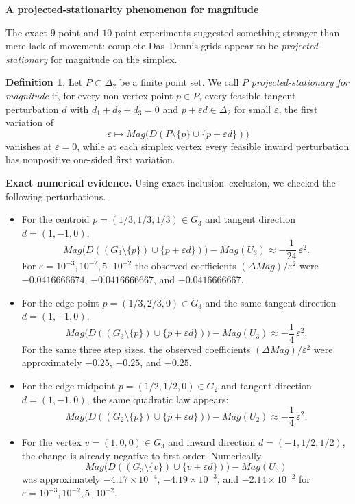 \documentclass{article}
\def\Mag{Mag}%
\theoremstyle{definition}
\newtheorem{definition}[theorem]{Definition}
\newcommand{\Mag}{\operatorname{Mag}}
\newcommand{\1}{\mathbf{1}}
\newcommand{\myparagraph}[1]{\medskip\noindent\textbf{#1}}
\begin{document}
\myparagraph{A projected-stationarity phenomenon for magnitude}

The exact $9$-point and $10$-point experiments suggested something stronger than mere lack of movement: complete Das--Dennis grids appear to be \emph{projected-stationary} for magnitude on the simplex.

\begin{definition}
Let $P\subset\Delta_2$ be a finite point set. We call $P$ \emph{projected-stationary for magnitude} if, for every non-vertex point $p\in P$, every feasible tangent perturbation $d$ with $d_1+d_2+d_3=0$ and $p+\varepsilon d\in\Delta_2$ for small $\varepsilon$, the first variation of
\[
\varepsilon\longmapsto \Mag\bigl(D(P\setminus\{p\}\cup\{p+\varepsilon d\})\bigr)
\]
vanishes at $\varepsilon=0$, while at each simplex vertex every feasible inward perturbation has nonpositive one-sided first variation.
\end{definition}

\myparagraph{Exact numerical evidence.}
Using exact inclusion--exclusion, we checked the following perturbations.

\begin{itemize}[leftmargin=2em]
\item For the centroid $p=(1/3,1/3,1/3)\in G_3$ and tangent direction $d=(1,-1,0)$,
\[
\Mag\bigl(D((G_3\setminus\{p\})\cup\{p+\varepsilon d\})\bigr)-\Mag(U_3)
\approx -\frac{1}{24}\,\varepsilon^2.
\]
For $\varepsilon=10^{-3},10^{-2},5\cdot 10^{-2}$ the observed coefficients $(\Delta \Mag)/\varepsilon^2$ were $-0.0416666674$, $-0.0416666667$, and $-0.0416666667$.

\item For the edge point $p=(1/3,2/3,0)\in G_3$ and the same tangent direction $d=(1,-1,0)$,
\[
\Mag\bigl(D((G_3\setminus\{p\})\cup\{p+\varepsilon d\})\bigr)-\Mag(U_3)
\approx -\frac{1}{4}\,\varepsilon^2.
\]
For the same three step sizes, the observed coefficients $(\Delta \Mag)/\varepsilon^2$ were approximately $-0.25$, $-0.25$, and $-0.25$.

\item For the edge midpoint $p=(1/2,1/2,0)\in G_2$ and tangent direction $d=(1,-1,0)$, the same quadratic law appears:
\[
\Mag\bigl(D((G_2\setminus\{p\})\cup\{p+\varepsilon d\})\bigr)-\Mag(U_2)
\approx -\frac{1}{4}\,\varepsilon^2.
\]

\item For the vertex $v=(1,0,0)\in G_3$ and inward direction $d=(-1,1/2,1/2)$, the change is already negative to first order. Numerically,
\[
\Mag\bigl(D((G_3\setminus\{v\})\cup\{v+\varepsilon d\})\bigr)-\Mag(U_3)
\]
was approximately $-4.17\times 10^{-4}$, $-4.19\times 10^{-3}$, and $-2.14\times 10^{-2}$ for $\varepsilon=10^{-3},10^{-2},5\cdot 10^{-2}$.
\end{itemize}
\end{document}
